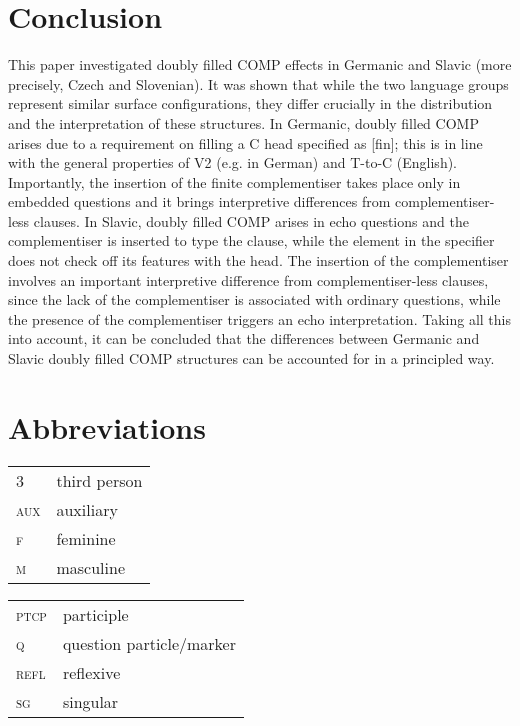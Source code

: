 \documentclass[output=paper,
modfonts, hidelinks, newtxmath
]{langscibook}
\begin{document}
\section{Conclusion}
This paper investigated doubly filled COMP effects in Germanic and Slavic (more precisely, Czech and Slovenian). It was shown that while the two language groups represent similar surface configurations, they differ crucially in the distribution and the interpretation of these structures. In Germanic, doubly filled COMP arises due to a requirement on filling a C head specified as [fin]; this is in line with the general properties of V2 (e.g. in German) and T-to-C (English). Importantly, the insertion of the finite complementiser takes place only in embedded questions and it brings interpretive differences from complementiser-less clauses. In Slavic, doubly filled COMP arises in echo questions and the complementiser is inserted to type the clause, while the element in the specifier does not check off its features with the head. The insertion of the complementiser involves an important interpretive difference from complementiser-less clauses, since the lack of the complementiser is associated with ordinary questions, while the presence of the complementiser triggers an echo interpretation. Taking all this into account, it can be concluded that the differences between Germanic and Slavic doubly filled COMP structures can be accounted for in a principled way.




\section*{Abbreviations}

\begin{tabularx}{.5\textwidth}{@{}lQ@{}}
3&third person\\
\textsc{aux}&auxiliary\\
\textsc{f}&feminine\\
\textsc{m}&masculine\\
\end{tabularx}%
\begin{tabularx}{.5\textwidth}{@{}lQ@{}}
\textsc{ptcp}&participle\\
\textsc{q}&question particle/marker\\
\textsc{refl}&reflexive\\
\textsc{sg}&singular\\
\end{tabularx}
\end{document}
